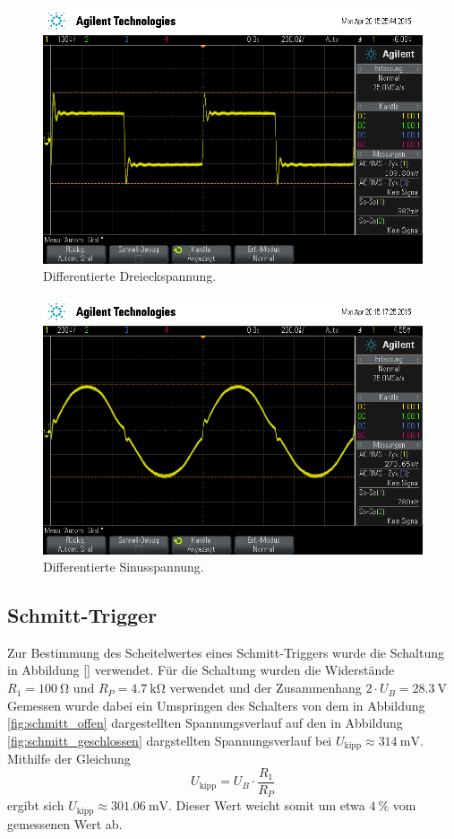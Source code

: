 \begin{figure}[!h]
    \centering
    \includegraphics[width=0.8\linewidth]{data/scope_9.png}
    \caption{Differentierte Dreieckspannung.}
    \label{fig:dif_dreieck}
\end{figure}

\begin{figure}[!h]
    \centering
    \includegraphics[width=0.8\linewidth]{data/scope_7.png}
    \caption{Differentierte Sinusspannung.}
    \label{fig:dif_sinus}
\end{figure}

\subsection{Schmitt-Trigger} %
\label{sub:schmitt_trigger}

Zur Bestimmung des Scheitelwertes eines Schmitt-Triggers wurde die Schaltung in Abbildung \ref{} verwendet.
Für die Schaltung wurden die Widerstände $R_1 = \SI{100}{\ohm}$ und $R_P = \SI{4.7}{\kilo\ohm}$ verwendet und der Zusammenhang $2 \cdot U_B = \SI{28.3}{\volt}$
Gemessen wurde dabei ein Umspringen des Schalters von dem in Abbildung \ref{fig:schmitt_offen} dargestellten Spannungsverlauf auf den in Abbildung \ref{fig:schmitt_geschlossen} dargstellten Spannungsverlauf bei $U_\text{kipp} \approx \SI{314}{\milli\volt}$.
Mithilfe der Gleichung
\begin{equation*}
    U_\text{kipp} = U_B \cdot \frac{R_1}{R_P} 
\end{equation*}
ergibt sich $U_\text{kipp} \approx \SI{301.06}{\milli\volt}$.
Dieser Wert weicht somit um etwa $\SI{4}{\percent}$ vom gemessenen Wert ab.

